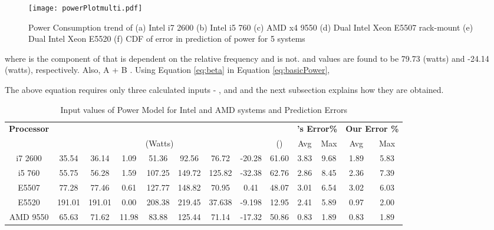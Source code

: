 \documentclass{sig-alternate}
\begin{document}
 \begin{figure*}[t]
\centering
\texttt{[image: powerPlotmulti.pdf]}
\caption{Power Consumption trend of (a) Intel i7 2600 (b) Intel i5 760 (c) AMD x4 9550 (d) Dual Intel Xeon E5507 rack-mount (e) Dual Intel Xeon E5520 (f) CDF of error in prediction of power for 5 systems}
\label{fig:powerPlotmulti}
 \vspace{-0.5cm}
\end{figure*}



where  is the component of  that is dependent on the relative frequency and  is not.  and  values are found to be 79.73 (watts) and -24.14 (watts), respectively. Also, A + B . Using Equation \ref{eq:beta} in Equation \ref{eq:basicPower}, 

The above equation requires only three calculated inputs - ,  and  and the next subsection explains how they are obtained.  
\begin{table*}[t]	
\caption{Input values of Power Model for Intel and AMD systems and Prediction Errors}
\begin{center}
\begin{tabular}{|c|c|c|c|c|c|c|c|c||c|c||c|c|}\hline
\textbf{Processor} 	& 	  	&	 	&	 	&	 	&	 	&		&		&	 	&	\multicolumn{2}{c||}{\textbf{\cite{Petrucci2011}'s Error\%}} 	&	\multicolumn{2}{c|}{\textbf{Our Error \%}} 	\\ 	\cline{2-13} 			
	&	\multicolumn{7}{c|}{(Watts)} 													&	() 	&	Avg 	&	Max 	&	Avg 	&	Max 	\\ \hline
 i7 2600	&	35.54	&	36.14	&	1.09	&	51.36	&	92.56	&	76.72	&	-20.28	&	61.60	&	3.83	&	9.68	&	1.89	&	5.83	\\ \hline
i5 760	&	55.75	&	56.28	&	1.59	&	107.25	&	149.72	&	125.82	&	-32.38	&	62.76	&	2.86	&	8.45	&	2.36	&	7.39	\\ \hline
 E5507	&	77.28	&	77.46	&	0.61	&	127.77	&	148.82	&	70.95	&	0.41	&	48.07	&	3.01	&	6.54	&	3.02	&	6.03	\\ \hline
 E5520	&	191.01	&	191.01	&	0.00	&	208.38	&	219.45	&	37.638	&	-9.198	&	12.95	&	2.41	&	5.89	&	0.97	&	2.00	\\ \hline
AMD 9550	&	65.63	&	71.62	&	11.98	&	83.88	&	125.44	&	71.14	&	-17.32	&	50.86	&	0.83	&	1.89	&	0.83	&	1.89	\\ \hline






\end{tabular}
\label{powerInput}
\end{center}
 \vspace{-0.5cm}
\end{table*}
\end{document}
